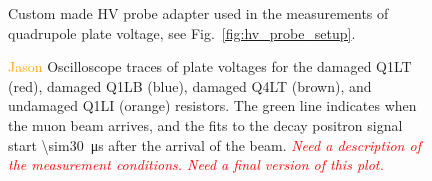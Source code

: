 \begin{figure}[]
	\centering
	\begin{subfigure}{\columnwidth}
		\caption{}\label{fig:hv_probe_adapt_front}
	\end{subfigure}
	\begin{subfigure}{\columnwidth}
		\caption{}\label{fig:hv_probe_adapt_back}
	\end{subfigure}
	\caption{Custom made HV probe adapter used in the measurements of quadrupole plate voltage, see Fig.~\ref{fig:hv_probe_setup}.}\label{fig:hv_probe_adapt}
\end{figure}

\begin{figure}[]
	\centering
	\caption{\textcolor{orange}{Jason} Oscilloscope traces of plate voltages for the damaged Q1LT (red), damaged Q1LB (blue), damaged Q4LT (brown), and undamaged Q1LI (orange) resistors. The green line indicates when the muon beam arrives, and the fits to the decay positron signal start \SI{\sim30}{\micro\second} after the arrival of the beam. \textcolor{red}{\textit{Need a description of the measurement conditions. Need a final version of this plot.}}}\label{fig:bad_resistor_hvtraces}
\end{figure}

